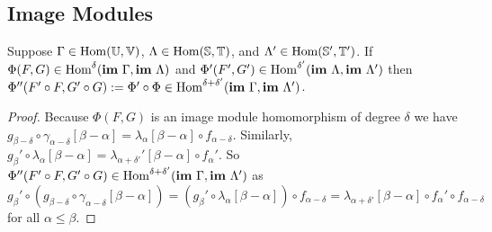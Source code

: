 \subsection{Image Modules}

\begin{lemma}\label{lem:image_composition}
  Suppose $\Gamma\in\mathrm{Hom}(\mathbb{U},\mathbb{V})$, $\Lambda\in\mathrm{Hom}(\mathbb{S},\mathbb{T})$, and $\Lambda'\in\mathrm{Hom}(\mathbb{S}',\mathbb{T}')$.
  If $\Phi(F, G)\in\mathrm{Hom}^\delta(\mathbf{im}~\Gamma, \mathbf{im}~\Lambda)$ and $\Phi'(F', G')\in\mathrm{Hom}^{\delta'}(\mathbf{im}~\Lambda, \mathbf{im}~\Lambda')$ then $\Phi''(F'\circ F, G'\circ G) := \Phi'\circ\Phi\in\mathrm{Hom}^{\delta+\delta'}(\mathbf{im}~\Gamma,\mathbf{im}~\Lambda')$.
\end{lemma}
\begin{proof}
  Because $\Phi(F, G)$ is an image module homomorphism of degree $\delta$ we have $g_{\beta-\delta}\circ\gamma_{\alpha-\delta}[\beta-\alpha] = \lambda_\alpha[\beta-\alpha]\circ f_{\alpha-\delta}$.
  Similarly, $g_{\beta}'\circ\lambda_{\alpha}[\beta-\alpha] = \lambda_{\alpha +\delta'}'[\beta-\alpha]\circ f_{\alpha}'$.
  So $\Phi''(F'\circ F, G'\circ G)\in\mathrm{Hom}^{\delta+\delta'}(\mathbf{im}~\Gamma,\mathbf{im}~\Lambda')$ as
  \[ g_\beta'\circ (g_{\beta-\delta}\circ \gamma_{\alpha-\delta}[\beta-\alpha]) = (g_\beta'\circ \lambda_\alpha[\beta-\alpha])\circ f_{\alpha-\delta} =\lambda_{\alpha+\delta'}[\beta-\alpha]\circ f_\alpha'\circ f_{\alpha-\delta}\]
  for all $\alpha\leq\beta$.
\end{proof}


